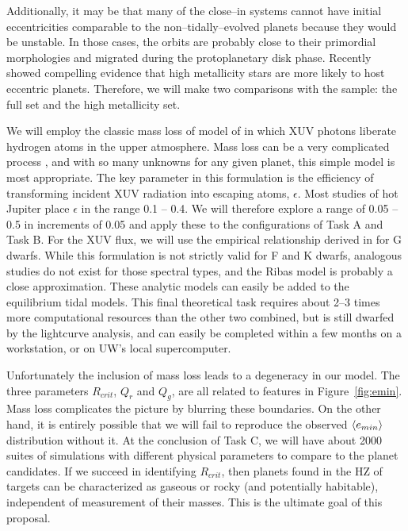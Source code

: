 Additionally, it may be that many of the close--in systems cannot
have initial eccentricities comparable to the non--tidally--evolved
planets because they would be unstable.  In those cases, the orbits
are probably close to their primordial morphologies and 
migrated during the protoplanetary disk phase.  Recently
\cite{DawsonMurrayClay13} showed compelling evidence that high
metallicity stars are more likely to host eccentric planets.
Therefore, we will make two comparisons with the \kepler sample: the
full set and the high metallicity set.

\medskip
{\centerline{}}
\smallskip

We will employ the classic mass loss of model of \cite{2007A&A...472..329E} in
which XUV photons liberate hydrogen atoms in the upper atmosphere.
Mass loss can be a very complicated process
\citep{Yelle04,Lammer07,Khodachenko07,Leitzinger11,Lammer13}, and with
so many unknowns for any given planet, this simple model is most
appropriate.  The key parameter in this formulation is the efficiency
of transforming incident XUV radiation into escaping atoms,
$\epsilon$.  Most studies of hot Jupiter place $\epsilon$ in the range
0.1 -- 0.4.  We will therefore explore a range of 0.05 -- 0.5 in
increments of 0.05 and apply these to the configurations of Task A and
Task B.  For the XUV flux, we will use the empirical relationship
derived in \cite{Ribas05} for G dwarfs.  While this formulation is not
strictly valid for F and K dwarfs, analogous studies do not exist for
those spectral types, and the Ribas model is probably a close
approximation.  These analytic models can easily be added to the
equilibrium tidal models.  This final theoretical task requires about
2--3 times more computational resources than the other two combined,
but is still dwarfed by the \kepler lightcurve analysis, and can
easily be completed within a few months on a workstation, or on UW's
local supercomputer.

Unfortunately the inclusion of mass loss leads to a degeneracy in our
model.  The three parameters $R_{crit}$, $Q_r$ and $Q_g$, are all
related to features in Figure~\ref{fig:emin}.  Mass loss complicates
the picture by blurring these boundaries.  On the other hand, it is
entirely possible that we will fail to reproduce the observed
$\left< e_{min} \right>$ distribution without it.  At the conclusion of Task C,
we will have about 2000 suites of simulations with different physical
parameters to compare to the
\kepler planet candidates.  If we succeed in identifying $R_{crit}$,
then planets found in the HZ of \kepler targets can be characterized
as gaseous or rocky (and potentially habitable), independent of
measurement of their masses.  This is the ultimate goal of this
proposal.

